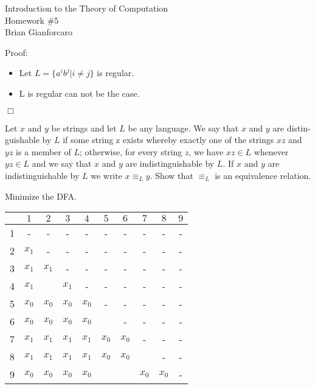 \documentclass[11pt]{article}
\newcommand{\question}[2] {\vspace{.25in} \fbox{#1} #2 \vspace{.10in}}
\begin{document}
\medskip                        %

\begin{center}                  %
  {\Large Introduction to the Theory of Computation \\ Homework \#5} \\
  Brian Gianforcaro \\
  \date \\
\end{center}

\ttfamily


\question{1}{Proof:}
\begin{center}
  \begin{itemize}
    \item Let $L = \{ a^{i} b^{j} | i \ne j \} $ is regular.

    \item L is regular can not be the case.
  \end{itemize}
\end{center}

\indent $\Box$


\question{2}{
Let $x$ and $y$ be strings and let $L$ be any language. We say that $x$ and $y$ are distin- 
guishable by $L$ if some string z exists whereby exactly one of the strings $xz$ and $yz$ 
is a member of $L$; otherwise, for every string $z$, we have $xz \in L$ whenever $yz \in L$ 
and we say that $x$ and $y$ are indistinguishable by $L$. If $x$ and $y$ are indistinguishable 
by $L$ we write $x {\equiv}_{L} y$. Show that ${\equiv}_{L}$ is an equivalence relation.
  }

\question{3}{}

\question{4}{Minimize the DFA.}

\begin{center}
\begin{tabular}{|c|c|c|c|c|c|c|c|c|c|}
\hline
$\;$&$1$&$2$&$3$&$4$&$5$&$6$&$7$&$8$&$9$\\
\hline
1&-&-&-&-&-&-&-&-&-\\
\hline
2&$x_1$&-&-&-&-&-&-&-&-\\
\hline
3&$x_1$&$x_1$&-&-&-&-&-&-&-\\
\hline
4&$x_1$&\;&$x_1$&-&-&-&-&-&-\\
\hline
5&$x_0$&$x_0$&$x_0$&$x_0$&-&-&-&-&-\\
\hline
6&$x_0$&$x_0$&$x_0$&$x_0$&\;&-&-&-&-\\
\hline
7&$x_1$&$x_1$&$x_1$&$x_1$&$x_0$&$x_0$&-&-&-\\
\hline
8&$x_1$&$x_1$&$x_1$&$x_1$&$x_0$&$x_0$&\;&-&-\\
\hline
9&$x_0$&$x_0$&$x_0$&$x_0$&\;&\;&$x_0$&$x_0$&-\\
\hline
\end{tabular}
\end{center}
\end{document}
